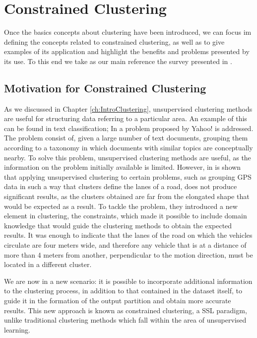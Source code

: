 \chapter{Constrained Clustering}\label{ch:ConstrainedClustering}

Once the basics concepts about clustering have been introduced, we can focus im defining the concepts related to constrained clustering, as well as to give examples of its application and highlight the benefits and problems presented by its use. To this end we take as our main reference the survey presented in \cite{davidson2007survey}.

\section{Motivation for Constrained Clustering}

As we discussed in Chapter \ref{ch:IntroClustering}, unsupervised clustering methods are useful for structuring data referring to a particular area. An example of this can be found in text classification; In \cite{cohn2003semi} a problem proposed by Yahoo! is addressed. The problem consist of, given a large number of text documents, grouping them according to a taxonomy in which documents with similar topics are conceptually nearby. To solve this problem, unsupervised clustering methods are useful, as the information on the problem initially available is limited. However, in \cite{wagstaff2001constrained} is shown that applying unsupervised clustering to certain problems, such as grouping \acf{GPS} data in such a way that clusters define the lanes of a road, does not produce significant results, as the clusters obtained are far from the elongated shape that would be expected as a result. To tackle the problem, they introduced a new element in clustering, the constraints, which made it possible to include domain knowledge that would guide the clustering methods to obtain the expected results. It was enough to indicate that the lanes of the road on which the vehicles circulate are four meters wide, and therefore any vehicle that is at a distance of more than 4 meters from another, perpendicular to the motion direction, must be located in a different cluster.

We are now in a new scenario: it is possible to incorporate additional information to the clustering process, in addition to that contained in the dataset itself, to guide it in the formation of the output partition and obtain more accurate results. This new approach is known as constrained clustering, a \acf{SSL} paradigm, unlike traditional clustering methods which fall within the area of unsupervised learning. 

